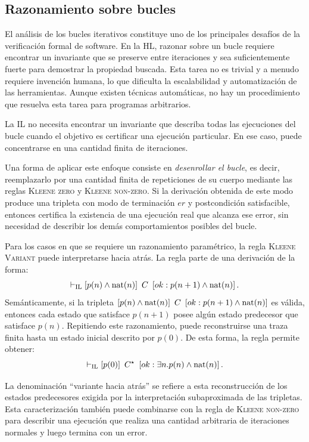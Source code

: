 \documentclass[a4paper,	11pt]{report}
\begin{document}
\subsection*{Razonamiento sobre bucles}
El análisis de los bucles iterativos constituye uno de los principales desafíos de la verificación formal de software.
En la HL,
razonar sobre un bucle requiere encontrar un invariante
que se preserve entre iteraciones y sea suficientemente fuerte para demostrar la propiedad buscada.
Esta tarea no es trivial y a menudo requiere invención humana,
lo que dificulta la escalabilidad y automatización de las herramientas.
Aunque existen técnicas automáticas,
no hay un procedimiento que resuelva esta tarea para programas arbitrarios.

La IL no necesita encontrar un invariante que describa todas las ejecuciones del bucle
cuando el objetivo es certificar una ejecución particular.
En ese caso, puede concentrarse en una cantidad finita de iteraciones.

Una forma de aplicar este enfoque consiste en \emph{desenrollar el bucle}, es decir,
reemplazarlo por una cantidad finita de repeticiones de su cuerpo mediante
las reglas \textsc{Kleene zero} y \textsc{Kleene non-zero}.
Si la derivación obtenida de este modo produce una tripleta con modo de terminación $er$ y postcondición satisfacible,
entonces certifica la existencia de una ejecución real que alcanza ese error,
sin necesidad de describir los demás comportamientos posibles del bucle.

Para los casos en que se requiere un razonamiento paramétrico,
la regla \textsc{Kleene Variant} puede interpretarse hacia atrás.
La regla parte de una derivación de la forma:
$$\vdash_{\mathrm{IL}} \left\lbrack p(n) \land \operatorname{nat}(n) \right\rbrack~C~\left\lbrack ok : p(n + 1) \land \operatorname{nat}(n) \right\rbrack.$$
Semánticamente, si la tripleta $\left\lbrack p(n) \land \operatorname{nat}(n) \right\rbrack~C~\left\lbrack ok : p(n + 1) \land \operatorname{nat}(n) \right\rbrack$ es válida,
entonces cada estado que satisface $p(n + 1)$ posee algún estado predecesor que satisface $p(n)$.
Repitiendo este razonamiento,
puede reconstruirse una traza finita hasta un estado inicial descrito por $p(0)$.
De esta forma, la regla permite obtener:
$$\vdash_{\mathrm{IL}} \left\lbrack p(0) \right\rbrack~C^\star~\left\lbrack ok : \exists n. p(n) \land \operatorname{nat}(n) \right\rbrack.$$

La denominación ``variante hacia atrás'' se refiere a esta reconstrucción de los estados predecesores
exigida por la interpretación subaproximada de las tripletas.
Esta caracterización también puede combinarse con la regla de \textsc{Kleene non-zero} para describir una ejecución
que realiza una cantidad arbitraria de iteraciones normales y luego termina con un error.
\end{document}
